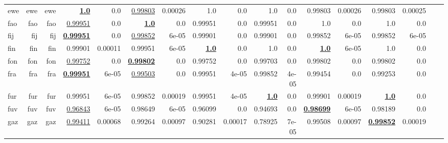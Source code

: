 \documentclass[11pt]{article}
\begin{document}
\begin{table*}[h]
{\begin{tabular}{lrrrrrrrrrrrrrrrr}
ewe         & ewe         & ewe         & \textbf{\underline{1.0}}         & 0.0         & \underline{0.99803}         & 0.00026         & 1.0         & 0.0         & 1.0         & 0.0         & 0.99803         & 0.00026         & 0.99803         & 0.00025         \\
fao         & fao         & fao         & \underline{0.99951}         & 0.0         & \textbf{\underline{1.0}}         & 0.0         & 0.99951         & 0.0         & 0.99951         & 0.0         & 1.0         & 0.0         & 1.0         & 0.0         \\
fij         & fij         & fij         & \textbf{\underline{0.99951}}         & 0.0         & \underline{0.99852}         & 6e-05         & 0.99901         & 0.0         & 0.99901         & 0.0         & 0.99852         & 6e-05         & 0.99852         & 6e-05         \\
fin         & fin         & fin         & 0.99901         & 0.00011         & 0.99951         & 6e-05         & \textbf{\underline{1.0}}         & 0.0         & 1.0         & 0.0         & \textbf{\underline{1.0}}         & 6e-05         & 1.0         & 0.0         \\
fon         & fon         & fon         & \underline{0.99752}         & 0.0         & \textbf{\underline{0.99802}}         & 0.0         & 0.99752         & 0.0         & 0.99703         & 0.0         & 0.99802         & 0.0         & 0.99802         & 0.0         \\
fra         & fra         & fra         & \textbf{\underline{0.99951}}         & 6e-05         & \underline{0.99503}         & 0.0         & 0.99951         & 4e-05         & 0.99852         & 4e-05         & 0.99454         & 0.0         & 0.99253         & 0.0         \\
fur         & fur         & fur         & 0.99951         & 6e-05         & 0.99852         & 0.00019         & 0.99951         & 4e-05         & \textbf{\underline{1.0}}         & 0.0         & 0.99901         & 0.00019         & \textbf{\underline{1.0}}         & 0.0         \\
fuv         & fuv         & fuv         & \underline{0.96843}         & 6e-05         & 0.98649         & 6e-05         & 0.96099         & 0.0         & 0.94693         & 0.0         & \textbf{\underline{0.98699}}         & 6e-05         & 0.98189         & 0.0         \\
gaz         & gaz         & gaz         & \underline{0.99411}         & 0.00068         & 0.99264         & 0.00097         & 0.90281         & 0.00017         & 0.78925         & 7e-05         & 0.99508         & 0.00097         & \textbf{\underline{0.99852}}         & 0.00019         \\

\end{tabular}}
\end{table*}
\end{document}
